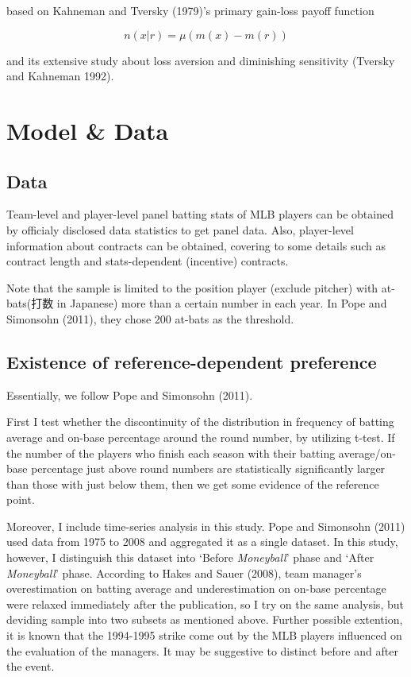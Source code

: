 \documentclass{jsarticle}[12pt]
\begin{document}
based on Kahneman and Tversky (1979)'s primary gain-loss payoff function

\[n(x|r) = \mu ( m(x) - m(r) ) \]

and its extensive study about loss aversion and diminishing sensitivity (Tversky and Kahneman 1992).

\section{Model \& Data}
 \subsection{Data}
 
 Team-level and player-level panel batting stats of MLB players can be obtained by officialy disclosed data statistics to get panel data. Also, player-level information about contracts can be obtained, covering to some details such as contract length and stats-dependent (incentive) contracts.
 
 Note that the sample is limited to the position player (exclude pitcher) with at-bats(打数 in Japanese) more than a certain number in each year. In Pope and Simonsohn (2011), they chose 200 at-bats as the threshold.
 
 \subsection{Existence of reference-dependent preference}
 
 Essentially, we follow Pope and Simonsohn (2011).
 
 First I test whether the discontinuity of the distribution in frequency of batting average and on-base percentage around the round number, by utilizing t-test. If the number of the players who finish each season with their batting average/on-base percentage just above round numbers are statistically significantly larger than those with just below them, then we get some evidence of the reference point.
 
 Moreover, I include time-series analysis in this study. Pope and Simonsohn (2011) used data from 1975 to 2008 and aggregated it as a single dataset. In this study, however, I distinguish this dataset into `Before \textit{Moneyball}' phase and `After \textit{Moneyball}' phase. According to Hakes and Sauer (2008), team manager's overestimation on batting average and underestimation on on-base percentage were relaxed immediately after the publication, so I try on the same analysis, but deviding sample into two subsets as mentioned above. Further possible extention, it is known that the 1994-1995 strike come out by the MLB players influenced on the evaluation of the managers. It may be suggestive to distinct before  and after the event.
 
\end{document}
